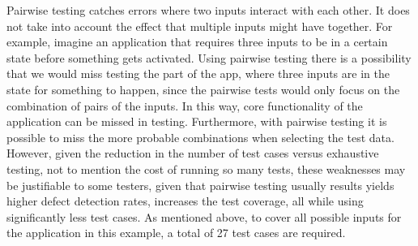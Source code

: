Pairwise testing catches errors where two inputs interact with each other.
It does not take into account the effect that multiple inputs might have
together. For example, imagine an application that requires three inputs to
be in a certain state before something gets activated. Using pairwise testing
there is a possibility that we would miss testing the part of the app,
where three inputs are in the state for something to happen, since
the pairwise tests would only focus on the combination of pairs of the inputs.
In this way, core functionality of the application can be missed in testing.
Furthermore, with pairwise testing it is possible to miss the more
probable combinations when selecting the test data. However, given the reduction
in the number of test cases versus exhaustive testing, not to mention the
cost of running so many tests, these weaknesses may be justifiable to some
testers, given that pairwise testing usually results yields higher defect
detection rates, increases the test coverage, all while using significantly
less test cases. As mentioned above, to cover all possible inputs for the
application in this example, a total of 27 test cases are required.

